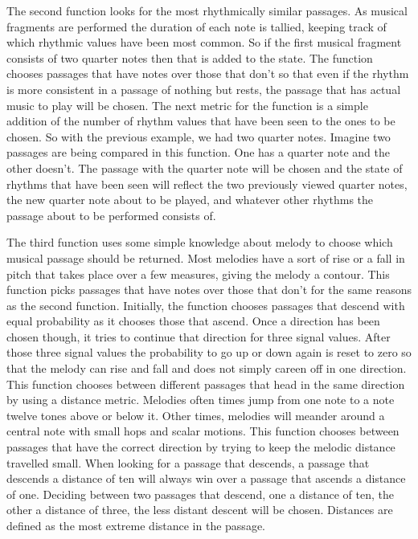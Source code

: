 \documentclass[12pt]{ucthesis}
\begin{document}
{The second function looks for the most rhythmically similar passages. As musical fragments are performed the duration of each note is tallied, keeping track of which rhythmic values have been most common. So if the first musical fragment consists of two quarter notes then that is added to the state. The function chooses passages that have notes over those that don't so that even if the rhythm is more consistent in a passage of nothing but rests, the passage that has actual music to play will be chosen. The next metric for the function is a simple addition of the number of rhythm values that have been seen to the ones to be chosen. So with the previous example, we had two quarter notes. Imagine two passages are being compared in this function. One has a quarter note and the other doesn't. The passage with the quarter note will be chosen and the state of rhythms that have been seen will reflect the two previously viewed quarter notes, the new quarter note about to be played, and whatever other rhythms the passage about to be performed consists of.

The third function uses some simple knowledge about melody to choose which musical passage should be returned. Most melodies have a sort of rise or a fall in pitch that takes place over a few measures, giving the melody a contour. This function picks passages that have notes over those that don't for the same reasons as the second function. Initially, the function chooses passages that descend with equal probability as it chooses those that ascend. Once a direction has been chosen though, it tries to continue that direction for three signal values. After those three signal values the probability to go up or down again is reset to zero so that the melody can rise and fall and does not simply careen off in one direction. This function chooses between different passages that head in the same direction by using a distance metric. Melodies often times jump from one note to a note twelve tones above or below it. Other times, melodies will meander around a central note with small hops and scalar motions. This function chooses between passages that have the correct direction by trying to keep the melodic distance travelled small. When looking for a passage that descends, a passage that descends a distance of ten will always win over a passage that ascends a distance of one. Deciding between two passages that descend, one a distance of ten, the other a distance of three, the less distant descent will be chosen. Distances are defined as the most extreme distance in the passage.

}
\end{document}
